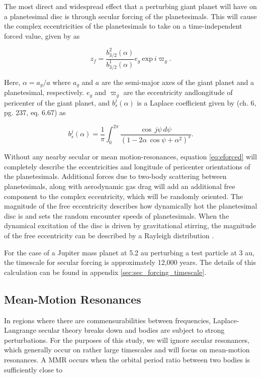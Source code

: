 The most direct and widespread effect that a perturbing giant planet will have on a planetesimal disc is through secular forcing of 
the planetesimals. This will cause the complex eccentricities of the planetesimals to take on a time-independent forced value, 
given by \cite{wyatt99} as

\begin{equation}\label{eq:eforced}
	z_{f} = \frac{b^{2}_{3/2} (\alpha)}{b^{1}_{3/2} (\alpha)} e_{g} ~ \mathrm{exp} ~ i \varpi_{g}.
\end{equation}

\noindent Here, $\alpha = a_{g} / a$ where $a_{g}$ and $a$ are the semi-major axes of the giant planet and a planetesimal, 
respectively. $e_{g}$ and $\varpi_{g}$ are the eccentricity andlongitude of pericenter of the giant planet, and $b^{j}_{s} (\alpha)$ 
is a Laplace coefficient given by \cite{murray99} (ch. 6, pg. 237, eq. 6.67) as

\begin{equation}\label{eq:lap}
	b_{s}^{j}(\alpha) = \frac{1}{\pi} \int_{0}^{2 \pi} \frac{\cos \, j \psi \, d \psi}{\left( 1 - 2 \alpha \, \cos \psi + \alpha^2 \right)^{s}}.
\end{equation}

Without any nearby secular or mean motion-resonances, equation \ref{eq:eforced} will completely describe the eccentricities and 
longitude of  pericenter orientations of the planetesimals. Additional forces due to two-body scattering between planetesimals, 
along with aerodynamic gas drag will add an additional free component to the complex eccentricity, which will be randomly 
oriented. The magnitude of the free eccentricity describes how dynamically hot the planetesimal disc is and sets the random 
encounter speeds of planetesimals. When the dynamical excitation of the disc is driven by gravitational stirring, the magnitude of 
the free eccentricity can be described by a Rayleigh distribution \cite{ida92}.

For the case of a Jupiter mass planet at 5.2 au perturbing a test particle at 3 au, the timescale for secular forcing is 
approximately 12,000 years. The details of this calculation can be found in appendix \ref{sec:sec_forcing_timescale}.

\subsection{Mean-Motion Resonances}\label{sec:mmr}

In regions where there are commensurabilities between frequencies, Laplace-Langrange secular theory breaks down and bodies 
are subject to strong perturbations. For the purposes of this study, we will ignore secular resonances, which generally occur on 
rather large timescales and will focus on mean-motion resonances. A MMR occurs  when the orbital period ratio between two 
bodies is sufficiently close to

